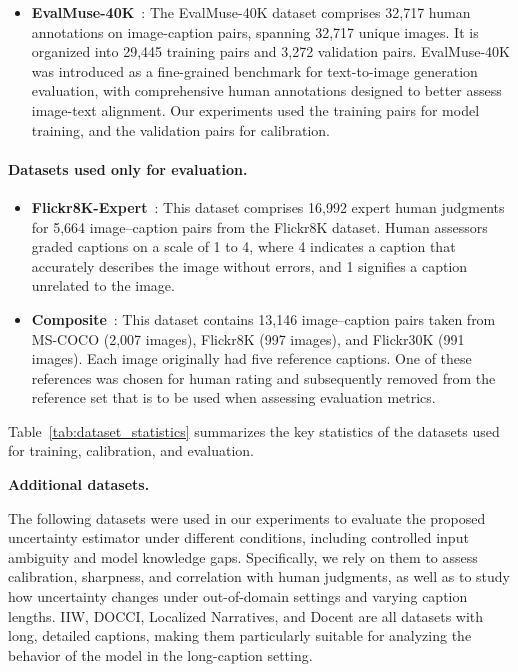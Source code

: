 \documentclass[11pt]{article}
\begin{document}
\begin{itemize}
\item \textbf{EvalMuse-40K}~\cite{han2024evalmuse}:
The EvalMuse-40K dataset comprises 32,717 human annotations on image-caption pairs, spanning 32,717 unique images. It is organized into 29,445 training pairs and 3,272 validation pairs. EvalMuse-40K was introduced as a fine-grained benchmark for text-to-image generation evaluation, with comprehensive human annotations designed to better assess image-text alignment. Our experiments used the training pairs for model training, and the validation pairs for calibration.
\end{itemize}

\paragraph{Datasets used only for evaluation.}
\begin{itemize}\setlength\itemsep{0em}
\item \textbf{Flickr8K-Expert}~\cite{hodosh2013framing}:
This dataset comprises 16,992 expert human judgments for 5,664 image–caption pairs from the Flickr8K dataset. Human assessors graded captions on a scale of 1 to 4, where 4 indicates a caption that accurately describes the image without errors, and 1 signifies a caption unrelated to the image.

\item \textbf{Composite}~\cite{aditya2015images}:
This dataset contains 13,146 image–caption pairs taken from MS-COCO (2,007 images), Flickr8K (997 images), and Flickr30K (991 images). Each image originally had five reference captions. One of these references was chosen for human rating and subsequently removed from the reference set that is to be used when assessing evaluation metrics.
\end{itemize}
Table~\ref{tab:dataset_statistics} summarizes the key statistics of the datasets used for training, calibration, and evaluation.

\newpage
\noindent \textbf{Additional datasets.}
\vspace{0.13cm}

The following datasets were used in our experiments to evaluate the proposed uncertainty estimator under different conditions, including controlled input ambiguity and model knowledge gaps. Specifically, we rely on them to assess calibration, sharpness, and correlation with human judgments, as well as to study how uncertainty changes under out-of-domain settings and varying caption lengths. IIW, DOCCI, Localized Narratives, and Docent are all datasets with long, detailed captions, making them particularly suitable for analyzing the behavior of the model in the long-caption setting.
\end{document}
